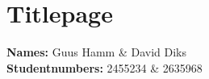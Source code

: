 \section{Titlepage}
\textbf {Names:}
Guus Hamm \& David Diks\\
\textbf{Studentnumbers:}
2455234 \& 2635968\\

